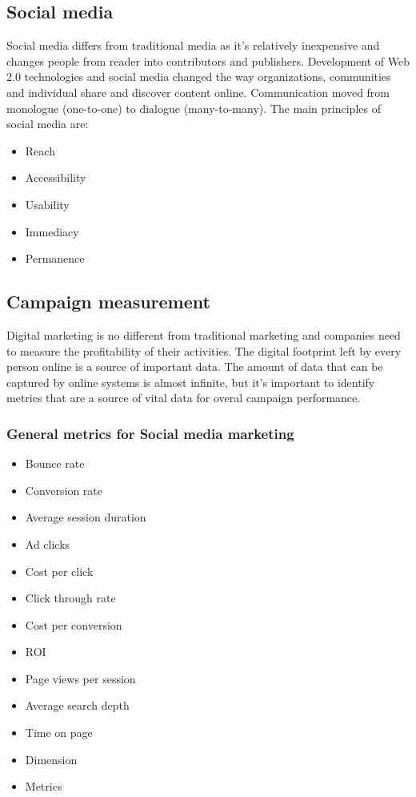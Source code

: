\documentclass{article}
\begin{document}
\subsection{Social media}
Social media differs from traditional media as it's relatively inexpensive and changes people from reader into contributors and publishers. Development of Web 2.0 technologies and social media changed the way organizations, communities and individual share and discover content online. Communication moved from monologue (one-to-one) to dialogue (many-to-many). The main principles of social media are:

\begin{itemize}
    \item Reach
    \item Accessibility
    \item Usability
    \item Immediacy
    \item Permanence
\end{itemize}

\subsection{Campaign measurement}
Digital marketing is no different from traditional marketing and companies need to measure the profitability of their activities. The digital footprint left by every person online is a source of important data. The amount of data that can be captured by online systems is almost infinite, but it's important to identify metrics that are a source of vital data for overal campaign performance.

\subsubsection*{General metrics for Social media marketing}
\begin{itemize}
    \item Bounce rate
    \item Conversion rate
    \item Average session duration
    \item Ad clicks
    \item Cost per click
    \item Click through rate
    \item Cost per conversion
    \item ROI
    \item Page views per session
    \item Average search depth
    \item Time on page
    \item Dimension
    \item Metrics
\end{itemize}
\end{document}
